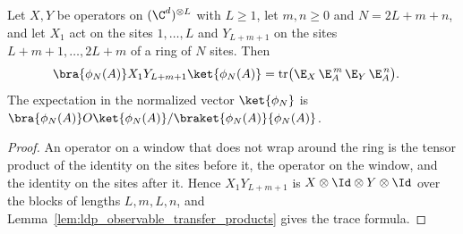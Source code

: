 \begin{lemma}
    \label{lem:ldp_two_window_trace}
    \leanok
    Let $X,Y$ be operators on $(\C^d)^{\otimes L}$ with $L\ge1$, let
    $m,n\ge0$ and $N=2L+m+n$, and let $X_1$ act on the sites $1,\dots,L$ and
    $Y_{L+m+1}$ on the sites $L+m+1,\dots,2L+m$ of a ring of $N$ sites. Then
    \begin{align}
        \bra{\phi_N(A)}X_1Y_{L+m+1}\ket{\phi_N(A)}
         & =\operatorname{tr}\bigl(\E_X\,\E_A^{\,m}\,\E_Y\,\E_A^{\,n}\bigr).
        \notag
    \end{align}
    The expectation in the normalized vector $\ket{\phi_N}$ is
    $\bra{\phi_N(A)}O\ket{\phi_N(A)}/\braket{\phi_N(A)}{\phi_N(A)}$.
\end{lemma}
\begin{proof}
    \leanok
    An operator on a window that does not wrap around the ring is the tensor
    product of the identity on the sites before it, the operator on the window,
    and the identity on the sites after it. Hence $X_1Y_{L+m+1}$ is
    $X\otimes\Id\otimes Y\otimes\Id$ over the blocks of lengths $L,m,L,n$, and
    Lemma~\ref{lem:ldp_observable_transfer_products} gives the trace formula.
\end{proof}

